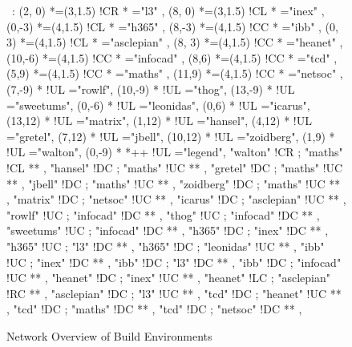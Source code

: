 
\begin{figure}

\begin{center}

\ \xy<1cm,0cm>:
(2, 0)  	*=(3,1.5) !CR  						*\frm{-} ="l3" , 
(8, 0)  	*=(3,1.5) !CL  							*\frm{-} ="inex" , 
(0,-3) 	*=(4,1.5) !CL  					*\frm{-} ="h365" , 
(8,-3) 	*=(4,1.5) !CC  			*\frm{-} ="ibb" , 
(0, 3)  	*=(4,1.5) !CL  					*\frm{-} ="asclepian" , 
(8, 3)  	*=(4,1.5) !CC  						*\frm{-} ="heanet" , 
(10,-6)  *=(4,1.5) !CC  						*\frm{-} ="infocad" , 
(8,6)  	*=(4,1.5) !CC  			*\frm{-} ="tcd" , 
(5,9)  	*=(4,1.5) !CC  *\frm{-} ="maths" , 
(11,9)  	*=(4,1.5) !CC  						*\frm{-} ="netsoc" , 
%
\POS (7,-9) * !UL ="rowlf",
\POS (10,-9) * !UL ="thog",
\POS (13,-9) * !UL ="sweetums",
%
\POS (0,-6) * !UL ="leonidas",
%
\POS (0,6) * !UL ="icarus",
%
\POS (13,12) * !UL ="matrix",
%
\POS (1,12) * !UL ="hansel",
\POS (4,12) * !UL ="gretel",
\POS (7,12) * !UL ="jbell",
\POS (10,12) * !UL ="zoidberg",
\POS (1,9) * !UL ="walton",
%
\POS (0,-9) * *++\frm{-} !UL ="legend",
%
"walton" 	!CR ; "maths" 		!CL **\dir{=} ,
"hansel" 	!DC ; "maths" 		!UC **\dir{=} ,
"gretel" 	!DC ; "maths" 		!UC **\dir{=} ,
"jbell"  	!DC ; "maths" 		!UC **\dir{=} ,
"zoidberg"  !DC ; "maths" 		!UC **\dir{=} ,
%
"matrix"  	!DC ; "netsoc" 	!UC **\dir{-} ,
%
"icarus"  	!DC ; "asclepian" !UC **\dir{=} ,
%
"rowlf"  	!UC ; "infocad" 	!DC **\dir{=} ,
"thog"	  	!UC ; "infocad" 	!DC **\dir{=} ,
"sweetums" 	!UC ; "infocad" 	!DC **\dir{=} ,
%
"h365" 		!DC ; "inex" 		!DC **\dir{-} ,
"h365" 		!UC ; "l3" 			!DC **\dir{-} ,
"h365" 		!DC ; "leonidas" 	!UC **\dir{=} ,
%
"ibb" 		!UC ; "inex" 		!DC **\dir{-} ,
"ibb" 		!DC ; "l3" 			!DC **\dir{-} ,
"ibb" 		!DC ; "infocad" 	!UC **\dir{-} ,
%
"heanet" 	!DC ; "inex" 		!UC **\dir{=} ,
"heanet" 	!LC ; "asclepian" !RC **\dir{=} ,
%
"asclepian" !DC ; "l3" 			!UC **\dir{-} ,
%
"tcd" 		!DC ; "heanet" 	!UC **\dir{=} ,
"tcd" 		!DC ; "maths" 		!DC **\dir{=} ,
"tcd" 		!DC ; "netsoc" 	!DC **\dir{=} ,
\endxy

\end{center}

\caption{Network Overview of Build Environments}

\end{figure}
